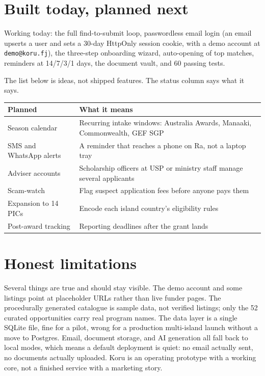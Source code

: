 \documentclass[11pt]{article}
\begin{document}
\section{Built today, planned next}

Working today: the full find-to-submit loop, passwordless email login (an email upserts a user and sets a 30-day HttpOnly session cookie, with a demo account at \texttt{demo@koru.fj}), the three-step onboarding wizard, auto-opening of top matches, reminders at 14/7/3/1 days, the document vault, and 60 passing tests.

The list below is ideas, not shipped features. The status column says what it says.

\begin{table}[h]
\centering
\begin{tabular}{@{}ll@{}}
\toprule
Planned & What it means \\
\midrule
Season calendar & Recurring intake windows: Australia Awards, Manaaki, Commonwealth, GEF SGP \\
SMS and WhatsApp alerts & A reminder that reaches a phone on Ra, not a laptop tray \\
Adviser accounts & Scholarship officers at USP or ministry staff manage several applicants \\
Scam-watch & Flag suspect application fees before anyone pays them \\
Expansion to 14 PICs & Encode each island country's eligibility rules \\
Post-award tracking & Reporting deadlines after the grant lands \\
\bottomrule
\end{tabular}
\end{table}

\section{Honest limitations}

Several things are true and should stay visible. The demo account and some listings point at placeholder URLs rather than live funder pages. The procedurally generated catalogue is sample data, not verified listings; only the 52 curated opportunities carry real program names. The data layer is a single SQLite file, fine for a pilot, wrong for a production multi-island launch without a move to Postgres. Email, document storage, and AI generation all fall back to local modes, which means a default deployment is quiet: no email actually sent, no documents actually uploaded. Koru is an operating prototype with a working core, not a finished service with a marketing story.
\end{document}
